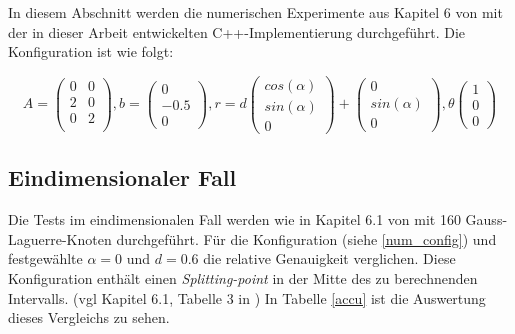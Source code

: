 In diesem Abschnitt werden die numerischen Experimente aus Kapitel 6 von \cite{gasperini:hal-03209144} mit der in dieser Arbeit entwickelten C++-Implementierung durchgeführt.
Die Konfiguration ist wie folgt:

\begin{equation}
  A = \begin{pmatrix}
      0 & 0 \\
      2 & 0 \\
      0 & 2 \\
  \end{pmatrix}, b = \begin{pmatrix}
      0 \\ -0.5\\ 0
  \end{pmatrix},
  r = d \begin{pmatrix}
      cos(\alpha) \\ sin(\alpha) \\ 0
  \end{pmatrix} + \begin{pmatrix}
    0 \\ sin(\alpha) \\ 0
\end{pmatrix}, \theta \begin{pmatrix}
   1 \\ 0 \\ 0
\end{pmatrix}
\end{equation}\label{num_config}


\subsection{Eindimensionaler Fall}

Die Tests im eindimensionalen Fall werden wie in Kapitel 6.1 von \cite{gasperini:hal-03209144} mit 160 Gauss-Laguerre-Knoten durchgeführt.
Für die Konfiguration (siehe \ref{num_config}) und festgewählte $\alpha = 0$ und $d=0.6$ die relative Genauigkeit verglichen.
Diese Konfiguration enthält einen \textit{Splitting-point} in der Mitte des zu berechnenden Intervalls. (vgl Kapitel 6.1, Tabelle 3 in \cite{gasperini:hal-03209144})
In Tabelle \ref{accu} ist die Auswertung dieses Vergleichs zu sehen.

